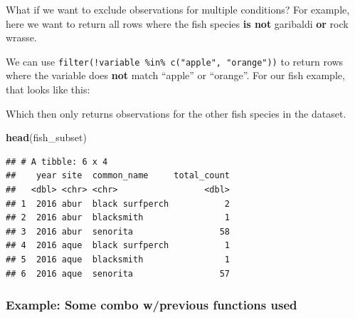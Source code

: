 \documentclass[]{book}
\newenvironment{Shaded}{\begin{snugshade}}{\end{snugshade}}
\newcommand{\DecValTok}[1]{\textcolor[rgb]{0.00,0.00,0.81}{#1}}
\newcommand{\KeywordTok}[1]{\textcolor[rgb]{0.13,0.29,0.53}{\textbf{#1}}}
\newcommand{\NormalTok}[1]{#1}
\newcommand{\OperatorTok}[1]{\textcolor[rgb]{0.81,0.36,0.00}{\textbf{#1}}}
\newcommand{\StringTok}[1]{\textcolor[rgb]{0.31,0.60,0.02}{#1}}
\begin{document}
\begin{Shaded}
\end{Shaded}

What if we want to exclude observations for multiple conditions? For example, here we want to return all rows where the fish species \textbf{is not} garibaldi \textbf{or} rock wrasse.

We can use \texttt{filter(!variable\ \%in\%\ c("apple",\ "orange"))} to return rows where the variable does \textbf{not} match ``apple'' or ``orange''. For our fish example, that looks like this:

\begin{Shaded}
\end{Shaded}

Which then only returns observations for the other fish species in the dataset.

\begin{Shaded}
\begin{Highlighting}[]
\KeywordTok{head}\NormalTok{(fish_subset)}
\end{Highlighting}
\end{Shaded}

\begin{verbatim}
## # A tibble: 6 x 4
##    year site  common_name     total_count
##   <dbl> <chr> <chr>                 <dbl>
## 1  2016 abur  black surfperch           2
## 2  2016 abur  blacksmith                1
## 3  2016 abur  senorita                 58
## 4  2016 aque  black surfperch           1
## 5  2016 aque  blacksmith                1
## 6  2016 aque  senorita                 57
\end{verbatim}

\hypertarget{example-some-combo-wprevious-functions-used}{%
\subsubsection{Example: Some combo w/previous functions used}\label{example-some-combo-wprevious-functions-used}}
\end{document}
